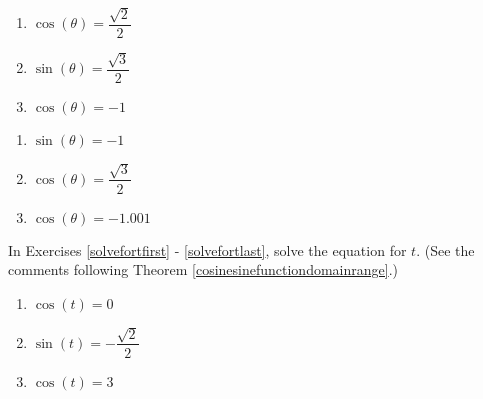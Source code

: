 \begin{multicols}{3}

\begin{enumerate}

\setcounter{enumi}{\value{HW}}

\item $\cos(\theta) = \dfrac{\sqrt{2}}{2}$
\item $\sin(\theta) = \dfrac{\sqrt{3}}{2}$
\item $\cos(\theta) = -1$ 

\setcounter{HW}{\value{enumi}}

\end{enumerate}

\end{multicols}

\begin{multicols}{3}

\begin{enumerate}

\setcounter{enumi}{\value{HW}}

\item  $\sin(\theta) = -1$ 
\item  $\cos(\theta) = \dfrac{\sqrt{3}}{2}$
\item  $\cos(\theta) = -1.001$  \label{solveforanglelast}

\setcounter{HW}{\value{enumi}}

\end{enumerate}

\end{multicols}

In Exercises \ref{solvefortfirst} - \ref{solvefortlast}, solve the equation for $t$.  (See the comments following Theorem \ref{cosinesinefunctiondomainrange}.)

\begin{multicols}{3}

\begin{enumerate}

\setcounter{enumi}{\value{HW}}

\item $\cos(t) = 0$  \label{solvefortfirst}
\item $\sin(t) = -\dfrac{\sqrt{2}}{2}$
\item $\cos(t) = 3$ 

\setcounter{HW}{\value{enumi}}

\end{enumerate}

\end{multicols}

